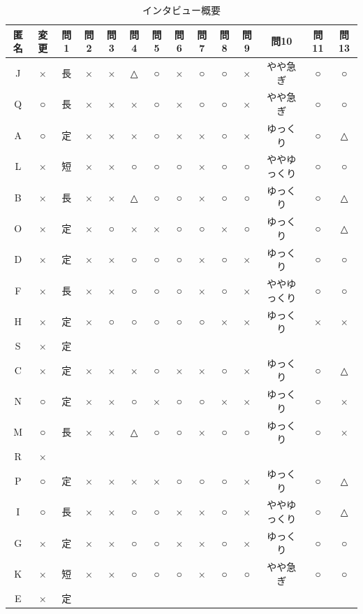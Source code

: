 \begin{table}[ht]
\begin{center}
 \caption{インタビュー概要}
\begin{tabular}{|c|c|c|c|c|c|c|c|c|c|c|c|c|c|} \hline
匿名 & 変更 & 問1 & 問2 & 問3 & 問4 & 問5 & 問6 & 問7 & 問8 & 問9 & 問10 & 問11 & 問13\\\hline
J & × & 長 & × & × & △ & ○ & × & ○ & ○ & × & やや急ぎ & ○ & ○\\\hline
Q & ○ & 長 & × & × & × & ○ & × & ○ & ○ & × & やや急ぎ & ○ & ○ \\\hline
A & ○ & 定 & × & × & × & ○ & × & × & ○ & × & ゆっくり & ○ & △\\\hline
L & × & 短 & × & × & ○ & ○ & ○ & × & ○ & ○ & ややゆっくり & ○ & ○\\\hline
B & × & 長 & × & × & △ & ○ & ○ & × & ○ & ○ & ゆっくり & ○ & △ \\\hline
O & × & 定 & × & ○ & × & × & ○ & ○ & × & ○ & ゆっくり & ○ & △ \\\hline
D & × & 定 & × & × & ○ & ○ & ○ & × & ○ & × & ゆっくり & ○ & ○ \\\hline
F & × & 長 & × & × & ○ & ○ & ○ & × & ○ & × & ややゆっくり & ○ & ○ \\\hline
H & × & 定 & × & ○ & ○ & ○ & ○ & ○ & × & × & ゆっくり & × & × \\\hline
S & × & 定 &  &  &  &  &  &  &  &  &  &  & \\\hline
C & × & 定 & × & × & × & ○ & × & × & ○ & × & ゆっくり & ○ & △ \\\hline
N & ○ & 定 & × & × & ○ & × & ○ & ○ & × & × & ゆっくり & ○ & × \\\hline
M & ○ & 長 & × & × & △ & ○ & ○ & × & ○ & ○ & ゆっくり & ○ & ×\\\hline
R & × &  &  &  &  &  &  &  &  &  &  &  & \\\hline
P & ○ & 定 & × & × & × & × & ○ & ○ & ○ & × & ゆっくり & ○ & △\\\hline
I & ○ & 長 & × & × & ○ & ○ & × & × & ○ & × & ややゆっくり & ○ & △ \\\hline
G & × & 定 & × & × & ○ & ○ & × & × & ○ & × & ゆっくり & ○ & ○\\\hline
K & × & 短 & × & × & ○ & ○ & ○ & × & ○ & ○ & やや急ぎ & ○ & ○ \\\hline
E & × & 定 &  &  &  &  &  &  &  &  &  &  &\\\hline
\end{tabular}
  \label{tb:interview}
\end{center}
\end{table}

